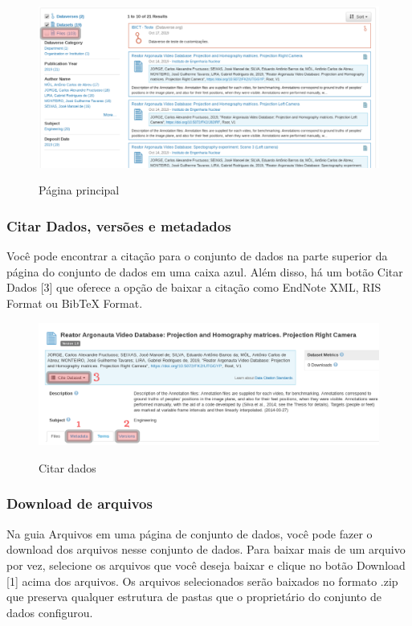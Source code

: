 \documentclass[12pt,hidelinks]{article}
\begin{document}
\begin{figure}[H]
\caption{Página principal}
\centering
    \includegraphics[width=1.0\textwidth]{imagens/USAAAA.png}
    \label{print1}
\end{figure}
   
	    \subsubsection{Citar Dados, versões e metadados}
	   
\qquad Você pode encontrar a citação para o conjunto de dados na parte superior da página do conjunto de dados em uma caixa azul. Além disso, há um botão Citar Dados [3] que oferece a opção de baixar a citação como EndNote XML, RIS Format ou BibTeX Format.
	    
\begin{figure}[H]
\caption{Citar dados}
\centering
    \includegraphics[width=1.0\textwidth]{imagens/PFVFU.png}
    \label{print2}
\end{figure}


    	\subsubsection{Download de arquivos}
    	
\qquad Na guia Arquivos em uma página de conjunto de dados, você pode fazer o download dos arquivos nesse conjunto de dados. Para baixar mais de um arquivo por vez, selecione os arquivos que você deseja baixar e clique no botão Download [1] acima dos arquivos. Os arquivos selecionados serão baixados no formato .zip que preserva qualquer estrutura de pastas que o proprietário do conjunto de dados configurou.
\end{document}
